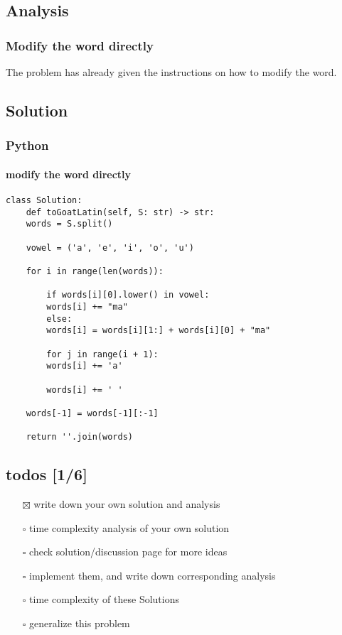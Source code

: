 \documentclass[11pt]{article}
\begin{document}
\subsection{Analysis}
\label{sec:orgcb14e34}
\subsubsection{Modify the word directly}
\label{sec:orge5f9556}
The problem has already given the instructions on how to modify the word.
\subsection{Solution}
\label{sec:orgbfe2413}
\subsubsection{Python}
\label{sec:org10d8d40}
\paragraph{modify the word directly}
\label{sec:orgba1dda1}
\begin{verbatim}
class Solution:
    def toGoatLatin(self, S: str) -> str:
	words = S.split()

	vowel = ('a', 'e', 'i', 'o', 'u')

	for i in range(len(words)):

	    if words[i][0].lower() in vowel:
		words[i] += "ma"
	    else:
		words[i] = words[i][1:] + words[i][0] + "ma"

	    for j in range(i + 1):
		words[i] += 'a'

	    words[i] += ' '

	words[-1] = words[-1][:-1]

	return ''.join(words)
\end{verbatim}
\subsection{todos [1/6]}
\label{sec:org481018a}
\begin{itemize}
\item[{$\boxtimes$}] write down your own solution and analysis
\item[{$\square$}] time complexity analysis of your own solution
\item[{$\square$}] check solution/discussion page for more ideas
\item[{$\square$}] implement them, and write down corresponding analysis
\item[{$\square$}] time complexity of these Solutions
\item[{$\square$}] generalize this problem
\end{itemize}
\end{document}
